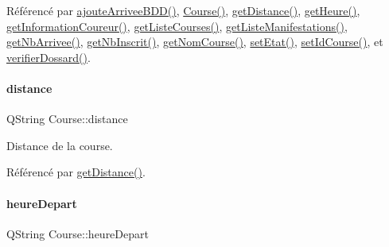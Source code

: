 Référencé par \hyperlink{class_course_ac99042bf8b20e8d3a54e72c8a80f7ee7}{ajoute\+Arrivee\+B\+D\+D()}, \hyperlink{class_course_af6317ecab95f8a2eb205b4f91b530992}{Course()}, \hyperlink{class_course_af20fcd6d6eb2dfbd3b0f12e273f12b27}{get\+Distance()}, \hyperlink{class_course_afc21f8195edd50c9fd266cff0c401b7c}{get\+Heure()}, \hyperlink{class_course_a7ba5d2c9865065e95f49a24fbeec7857}{get\+Information\+Coureur()}, \hyperlink{class_course_ae5e74946d973166ad3000e38600acf20}{get\+Liste\+Courses()}, \hyperlink{class_course_a0d995ef72152208e02eb3b10315dfabb}{get\+Liste\+Manifestations()}, \hyperlink{class_course_ad8dd87e7f299bc938f40423f28c837e8}{get\+Nb\+Arrivee()}, \hyperlink{class_course_ad0ff4153f1e02826d551f478f95ad260}{get\+Nb\+Inscrit()}, \hyperlink{class_course_a7b4485a0b38bc3b908131962b705d880}{get\+Nom\+Course()}, \hyperlink{class_course_a3ebcde1fa443cb20d71fb98af4d0c418}{set\+Etat()}, \hyperlink{class_course_a36cf16c971841431947b6fbe2b3f3d27}{set\+Id\+Course()}, et \hyperlink{class_course_a6cb3ede6a11e4813f95be92f4459a3c2}{verifier\+Dossard()}.

\mbox{\label{class_course_af2f7b814a0ec0d76291a2743c61615a8}} 
\paragraph{\texorpdfstring{distance}{distance}}
{\footnotesize\ttfamily Q\+String Course\+::distance\hspace{0.3cm}{\ttfamily [private]}}



Distance de la course. 



Référencé par \hyperlink{class_course_af20fcd6d6eb2dfbd3b0f12e273f12b27}{get\+Distance()}.

\mbox{\label{class_course_aa2da10dd2fc8c1ca1d5831249181e61f}} 
\paragraph{\texorpdfstring{heure\+Depart}{heureDepart}}
{\footnotesize\ttfamily Q\+String Course\+::heure\+Depart\hspace{0.3cm}{\ttfamily [private]}}



